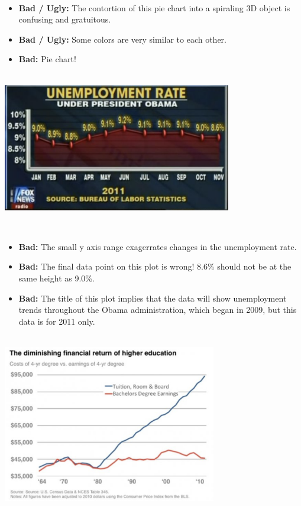\documentclass[
]{book}
\providecommand{\tightlist}{%
  \setlength{\itemsep}{0pt}\setlength{\parskip}{0pt}}
\begin{document}
~

\begin{itemize}
\tightlist
\item
  \textbf{Bad / Ugly:} The contortion of this pie chart into a spiraling 3D object is confusing and gratuitous.
\item
  \textbf{Bad / Ugly:} Some colors are very similar to each other.\\
\item
  \textbf{Bad:} Pie chart!
\end{itemize}

~\\

\includegraphics[width=0.75\textwidth,height=\textheight]{img/vis16.png}

~

\begin{itemize}
\tightlist
\item
  \textbf{Bad:} The small y axis range exagerrates changes in the unemployment rate.
\item
  \textbf{Bad:} The final data point on this plot is wrong! 8.6\% should not be at the same height as 9.0\%.
\item
  \textbf{Bad:} The title of this plot implies that the data will show unemployment trends throughout the Obama administration, which began in 2009, but this data is for 2011 only.
\end{itemize}

~\\

\includegraphics[width=0.7\textwidth,height=\textheight]{img/vis18.png}
\end{document}
